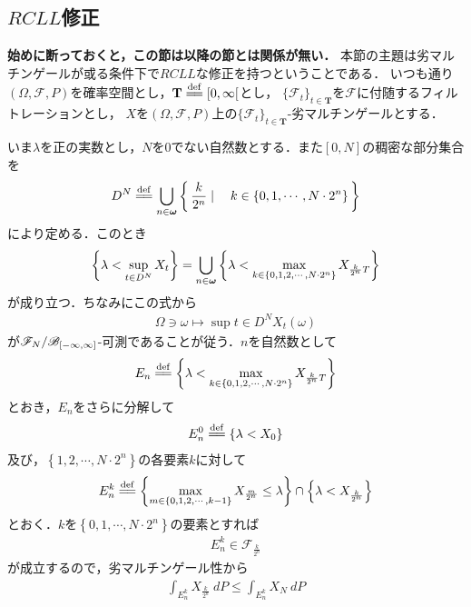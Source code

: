 \subsection{$RCLL$修正}
	{\bf 始めに断っておくと，この節は以降の節とは関係が無い．}
	本節の主題は劣マルチンゲールが或る条件下で$RCLL$な修正を持つということである．
	いつも通り$(\Omega,\mathscr{F},P)$を確率空間とし，$\mathbf{T} \defeq [0,\infty[$とし，
	$\{\mathscr{F}_t\}_{t \in \mathbf{T}}$を$\mathscr{F}$に付随するフィルトレーションとし，
	$X$を$(\Omega,\mathscr{F},P)$上の$\{\mathscr{F}_t\}_{t \in \mathbf{T}}$-劣マルチンゲールとする．
	
	いま$\lambda$を正の実数とし，$N$を$0$でない自然数とする．また$[0,N]$の稠密な部分集合を
	\begin{align}
		D^N \defeq \bigcup_{n \in \Natural} \Set{\frac{k}{2^n}}{k \in \{0,1,\cdots,N \cdot 2^n\}}
	\end{align}
	により定める．このとき
	\begin{align}
		\left\{\lambda < \operatorname*{sup}_{t \in D^N} X_t\right\}
		= \bigcup_{n \in {\boldsymbol \omega}} \left\{\lambda < \max_{k \in \left\{0,1,2,\cdots,N \cdot 2^n\right\}} X_{\frac{k}{2^n}T}\right\}
	\end{align}
	が成り立つ．ちなみにこの式から
	\begin{align}
		\Omega \ni \omega \longmapsto \sup{t \in D^N}X_t(\omega)
	\end{align}
	が$\mathscr{F}_N/\mathscr{B}_{[-\infty,\infty]}$-可測であることが従う．$n$を自然数として
	\begin{align}
		E_n \defeq  \left\{\lambda < \max_{k \in \left\{0,1,2,\cdots,N \cdot 2^n\right\}} X_{\frac{k}{2^n}T}\right\}
	\end{align}
	とおき，$E_n$をさらに分解して
	\begin{align}
		E_n^0 \defeq \left\{\lambda < X_0\right\}
	\end{align}
	及び，$\left\{1,2,\cdots,N \cdot 2^n\right\}$の各要素$k$に対して
	\begin{align}
		E_n^k \defeq \left\{ \max_{m \in \left\{0,1,2,\cdots,k-1\right\}} X_{\frac{m}{2^n}} \leq \lambda \right\} \cap \left\{\lambda < X_{\frac{k}{2^n}}\right\}
	\end{align}
	とおく．$k$を$\left\{0,1,\cdots,N \cdot 2^n\right\}$の要素とすれば
	\begin{align}
		E_n^k \in \mathscr{F}_{\frac{k}{2^n}}
	\end{align}
	が成立するので，劣マルチンゲール性から
	\begin{align}
		\int_{E_n^k} X_{\frac{k}{2^n}}\ dP \leq \int_{E_n^k} X_N\ dP
	\end{align}
